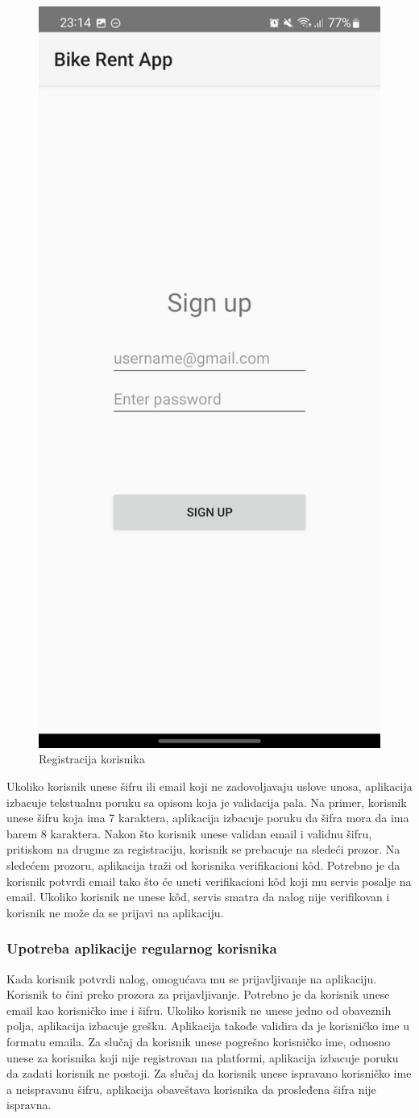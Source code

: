 \documentclass[12pt,oneside]{memoir}
\begin{document}
\begin{figure}[!ht]
  \centering
  \includegraphics[height=0.6\textwidth]{Registracija.jpg}
  \caption{Registracija korisnika}
  \label{fig:registracijaKorisnika}
\end{figure}

 
Ukoliko korisnik unese šifru ili email koji ne zadovoljavaju uslove unosa, aplikacija izbacuje tekstualnu poruku sa opisom koja je validacija pala. Na primer, korisnik unese šifru koja ima 7 karaktera, aplikacija izbacuje poruku da šifra mora da ima barem 8 karaktera. Nakon što korisnik unese validan email i validnu šifru, pritiskom na drugme za registraciju, korisnik se prebacuje na sledeći prozor. Na sledećem prozoru, aplikacija traži od korisnika verifikacioni kôd. Potrebno je da korisnik potvrdi email tako što će uneti verifikacioni kôd koji mu servis posalje na email. Ukoliko korisnik ne unese kôd, servis smatra da nalog nije verifikovan i korisnik ne može da se prijavi na aplikaciju.
 
\subsubsection{Upotreba aplikacije regularnog korisnika}
 
Kada korisnik potvrdi nalog, omogućava mu se prijavljivanje na aplikaciju. Korisnik to čini preko prozora za prijavljivanje. Potrebno je da korisnik unese email kao korisničko ime i šifru. Ukoliko korisnik ne unese jedno od obaveznih polja, aplikacija izbacuje grešku. Aplikacija takođe validira da je korisničko ime u formatu emaila. Za slučaj da korisnik unese pogrešno korisničko ime, odnosno unese za korisnika koji nije registrovan na platformi, aplikacija izbacuje poruku da zadati korisnik ne postoji. Za slučaj da korisnik unese ispravano korisničko ime a neispravanu šifru, aplikacija obaveštava korisnika da prosleđena šifra nije ispravna.
 
\end{document}
